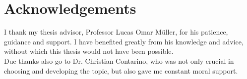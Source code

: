 
\chapter*{Acknowledgements}
\thispagestyle{empty}

I thank my thesis advisor, Professor Lucas Omar Müller, for his patience, guidance and support. I have benefited greatly from his knowledge and advice, without which this thesis would not have been possible.\\

Due thanks also go to Dr. Christian Contarino, who was not only crucial in choosing and developing the topic, but also gave me constant moral support.
\clearpage